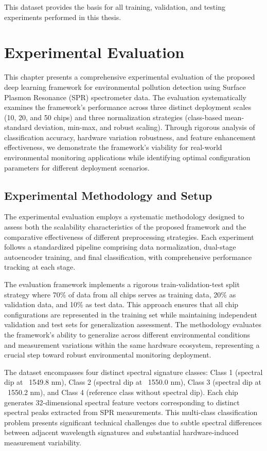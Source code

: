 This dataset provides the basis for all training, validation, and testing experiments performed in this thesis.

\chapter{Experimental Evaluation}
\label{ch:experimental_evaluation}

This chapter presents a comprehensive experimental evaluation of the proposed deep learning framework for environmental pollution detection using Surface Plasmon Resonance (SPR) spectrometer data. The evaluation systematically examines the framework's performance across three distinct deployment scales (10, 20, and 50 chips) and three normalization strategies (class-based mean-standard deviation, min-max, and robust scaling). Through rigorous analysis of classification accuracy, hardware variation robustness, and feature enhancement effectiveness, we demonstrate the framework's viability for real-world environmental monitoring applications while identifying optimal configuration parameters for different deployment scenarios.

\section{Experimental Methodology and Setup}
\label{sec:experimental_methodology}

The experimental evaluation employs a systematic methodology designed to assess both the scalability characteristics of the proposed framework and the comparative effectiveness of different preprocessing strategies. Each experiment follows a standardized pipeline comprising data normalization, dual-stage autoencoder training, and final classification, with comprehensive performance tracking at each stage.

The evaluation framework implements a rigorous train-validation-test split strategy where 70\% of data from all chips serves as training data, 20\% as validation data, and 10\% as test data. This approach ensures that all chip configurations are represented in the training set while maintaining independent validation and test sets for generalization assessment. The methodology evaluates the framework's ability to generalize across different environmental conditions and measurement variations within the same hardware ecosystem, representing a crucial step toward robust environmental monitoring deployment.

The dataset encompasses four distinct spectral signature classes: Class 1 (spectral dip at ~1549.8 nm), Class 2 (spectral dip at ~1550.0 nm), Class 3 (spectral dip at ~1550.2 nm), and Class 4 (reference class without spectral dip). Each chip generates 32-dimensional spectral feature vectors corresponding to distinct spectral peaks extracted from SPR measurements. This multi-class classification problem presents significant technical challenges due to subtle spectral differences between adjacent wavelength signatures and substantial hardware-induced measurement variability.

